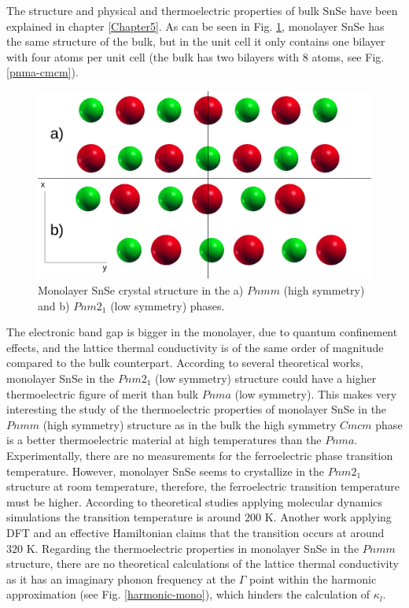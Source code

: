 The structure and physical and thermoelectric properties of bulk SnSe have been explained in chapter \ref{Chapter5}. 
As can be seen in Fig. \ref{pnma-cmcm-mono}, monolayer SnSe has the same structure of the bulk, but in the unit cell 
it only contains one bilayer with four atoms per unit cell (the bulk has two bilayers with 8 atoms, see 
Fig. \ref{pnma-cmcm}). 
\begin{figure}[h]
\begin{center}
\includegraphics[width=0.8\linewidth]{Figures/monolayer-structure.pdf}
\caption{Monolayer SnSe crystal structure in the a) $Pnmm$ (high symmetry) and b) $Pnm2_{1}$ (low symmetry) phases.}
\label{pnma-cmcm-mono}
\end{center}
\end{figure}
The electronic band gap is bigger in the monolayer\cite{wang2015thermoelectric,hu2017high}, due to quantum 
confinement effects, and the lattice thermal conductivity is of the same order of 
magnitude\cite{wang2015thermoelectric,hu2017high} compared to the bulk counterpart. According to several theoretical 
works, monolayer SnSe in the $Pnm2_{1}$ (low symmetry) structure could have a higher thermoelectric figure of 
merit\cite{wang2015thermoelectric,hu2017high} than bulk $Pnma$ (low symmetry). This makes very interesting the study 
of the thermoelectric properties of monolayer SnSe in the $Pnmm$ (high symmetry) structure as in the bulk the high 
symmetry $Cmcm$ phase is a better thermoelectric material at high temperatures than the $Pnma$. \\

Experimentally, there are no measurements for the ferroelectric phase transition temperature. However, monolayer 
SnSe seems to crystallize in the $Pnm2_{1}$ structure at room temperature\cite{li2013single}, therefore, the 
ferroelectric transition temperature must be higher. According to theoretical studies applying molecular dynamics 
simulations\cite{mehboudi2016structural,barraza2018tuning} the transition temperature is around $200$ K. Another 
work applying DFT and an effective Hamiltonian claims\cite{fei2016ferroelectricity} that the transition occurs at 
around $320$ K. Regarding the thermoelectric properties in monolayer SnSe in the $Pnmm$ structure, there are no 
theoretical calculations of the lattice thermal conductivity as it has an imaginary phonon frequency at the $\Gamma$ 
point within the harmonic approximation (see Fig. \ref{harmonic-mono}), which hinders the calculation 
of $\kappa_{l}$. \\


